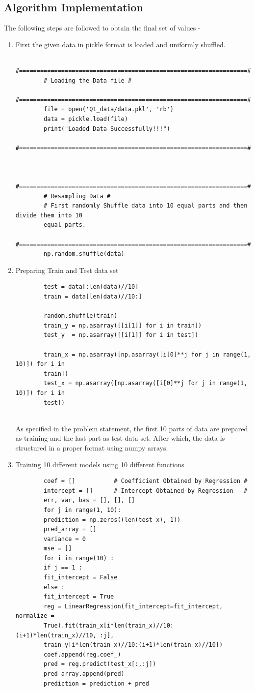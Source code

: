 \documentclass[11pt]{article}
\begin{document}
	\subsection{Algorithm Implementation}
	The following steps are followed to obtain the final set of values - 
	\begin{enumerate}
		\item First the given data in pickle format is loaded and uniformly shuffled.
		\begin{lstlisting}
		#=================================================================#
		# Loading the Data file #
		#=================================================================#
		file = open('Q1_data/data.pkl', 'rb')
		data = pickle.load(file)
		print("Loaded Data Successfully!!!")
		#=================================================================#
		
		
		#=================================================================#
		# Resampling Data #
		# First randomly Shuffle data into 10 equal parts and then divide them into 10
		equal parts.
		#=================================================================#
		np.random.shuffle(data)
		\end{lstlisting}	
		\item Preparing Train and Test data set
		\begin{lstlisting}
		test = data[:len(data)//10]
		train = data[len(data)//10:]
		
		random.shuffle(train)
		train_y = np.asarray([[i[1]] for i in train])
		test_y  = np.asarray([[i[1]] for i in test])
		
		train_x = np.asarray([np.asarray([i[0]**j for j in range(1, 10)]) for i in
		train])
		test_x = np.asarray([np.asarray([i[0]**j for j in range(1, 10)]) for i in
		test])
		
		\end{lstlisting}
		As specified in the problem statement, the first 10 parts of data are prepared
		as training and the last part as test data set. After which, the data is
		structured in a proper format using numpy arrays.
		\item Training 10 different models using 10 different functions
		\begin{lstlisting}
		coef = []			# Coefficient Obtained by Regression #
		intercept = []		# Intercept Obtained by Regression   #
		err, var, bas = [], [], []
		for j in range(1, 10):
		prediction = np.zeros((len(test_x), 1))
		pred_array = []
		variance = 0
		mse = []
		for i in range(10) :
		if j == 1 :
		fit_intercept = False
		else :
		fit_intercept = True
		reg = LinearRegression(fit_intercept=fit_intercept, normalize =
		True).fit(train_x[i*len(train_x)//10:(i+1)*len(train_x)//10, :j],
		train_y[i*len(train_x)//10:(i+1)*len(train_x)//10])
		coef.append(reg.coef_)
		pred = reg.predict(test_x[:,:j])
		pred_array.append(pred)
		prediction = prediction + pred
		

\end{lstlisting}
\end{enumerate}
\end{document}
